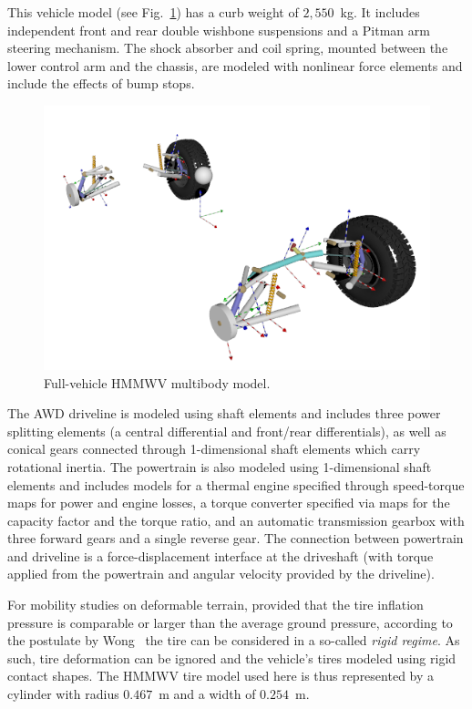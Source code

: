 \documentclass[12pt,twocolumn]{article}
\newcommand{\CHRONO}{{\sffamily{{Chrono}}}}
\begin{document}
This vehicle model (see Fig.~\ref{fig:hmmwv}) has a curb weight of $2,550$~kg.
%
It includes independent front and rear double wishbone suspensions and a Pitman arm steering mechanism. The shock absorber and coil spring, mounted between the lower control arm and the chassis, are modeled with {\CHRONO} nonlinear force elements and include the effects of bump stops.
%
\begin{figure}
	\centering
	\includegraphics[width=\columnwidth]{Figs/hmmwv_bodies.png}
	\caption{\small Full-vehicle HMMWV multibody model.}  
	\label{fig:hmmwv}
\end{figure}

The AWD driveline is modeled using {\CHRONO} shaft elements and includes three power splitting elements (a central differential and front/rear differentials), as well as conical gears connected through 1-dimensional shaft elements which carry rotational inertia. 
%
The powertrain is also modeled using 1-dimensional shaft elements and includes models for a thermal engine specified through speed-torque maps for power and engine losses, a torque converter specified via maps for the capacity factor and the torque ratio, and an automatic transmission gearbox with three forward gears and a single reverse gear.
%
The connection between powertrain and driveline is a force-displacement interface at the driveshaft (with torque applied from the powertrain and angular velocity provided by the driveline).

For mobility studies on deformable terrain, provided that the tire inflation pressure is comparable or larger than the average ground pressure, according to the postulate by Wong~\cite{wong93} the tire can be considered in a so-called {\em rigid regime}.  As such, tire deformation can be ignored and the vehicle's tires modeled using rigid contact shapes.  The HMMWV tire model used here is thus represented by a cylinder with radius $0.467$~m and a width of $0.254$~m.
\end{document}
